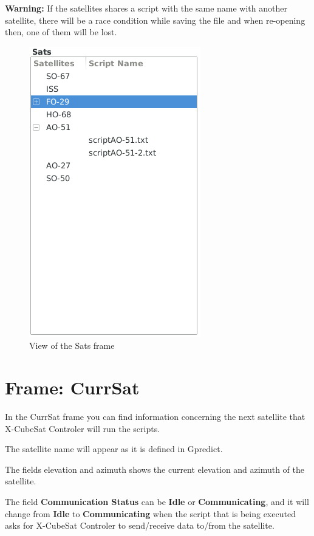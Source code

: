 \documentclass[pdftex,11pt,a4paper,titlepage]{report}
\begin{document}
\textbf{Warning:} If the satellites shares a script with the same name with another satellite, there will be a race condition while saving the file and when re-opening then, one of them will be lost. 
\begin{figure}[h]
\centering
\includegraphics[scale=0.8]{../images/SatsFrame.png}
\caption{View of the Sats frame}
\label{SatsFrame}
\end{figure}

\chapter{Frame: CurrSat}
\hspace{0.4cm} In the CurrSat frame you can find information concerning the next satellite that X-CubeSat Controler will run the scripts. 

The satellite name will appear as it is defined in Gpredict.

The fields elevation and azimuth shows the current elevation and azimuth of the satellite.

The field \textbf{Communication Status} can be \textbf{Idle} or \textbf{Communicating}, and it will change from \textbf{Idle} to \textbf{Communicating} when the script that is being executed asks for X-CubeSat Controler to send/receive data to/from the satellite.
\end{document}
